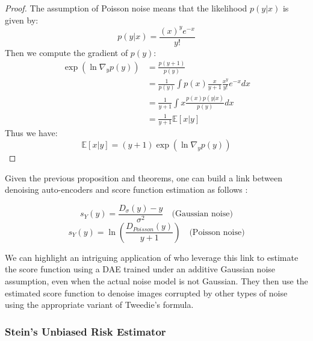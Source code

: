 \begin{proof}
    The assumption of Poisson noise means that the likelihood $p(y|x)$ is given by:
    \begin{equation*}
        p(y|x) = \frac{(x)^{y} e^{-x}}{y!}
    \end{equation*}
    Then we compute the gradient of $p(y)$:
    \begin{align*}
        \exp(\ln \nabla_y p(y)) &= \frac{p(y+1)}{p(y)} \\
        &= \frac{1}{p(y)} \int p(x) \frac{x}{y+1}\frac{x^y}{y!}e^{-x} dx \\
        &= \frac{1}{y+1} \int x \frac{p(x) p(y|x)}{p(y)} dx \\
        &= \frac{1}{y+1} \mathbb{E}[x|y]
    \end{align*}
    Thus we have:
    \begin{equation*}
        \mathbb{E}[x|y] = (y+1) \exp(\ln \nabla_y p(y))
    \end{equation*}
\end{proof}


Given the previous proposition and theorems, one can build a link between denoising auto-encoders and score function estimation as follows :

\begin{equation}
    s_Y(y) = \frac{D_{\sigma}(y) - y}{\sigma^2} \quad \text{(Gaussian noise)}
\end{equation}
\begin{equation}
    s_Y(y) = \ln \left( \frac{D_{Poisson}(y)}{y + 1} \right) \quad \text{(Poisson noise)}
\end{equation}

We can highlight an intriguing application of \cite{kim_noise2score_nodate} who leverage this link to estimate the score function using a DAE trained under an additive Gaussian noise assumption, even when the actual noise model is not Gaussian. They then use the estimated score function to denoise images corrupted by other types of noise using the appropriate variant of Tweedie's formula.

\subsubsection{Stein's Unbiased Risk Estimator}